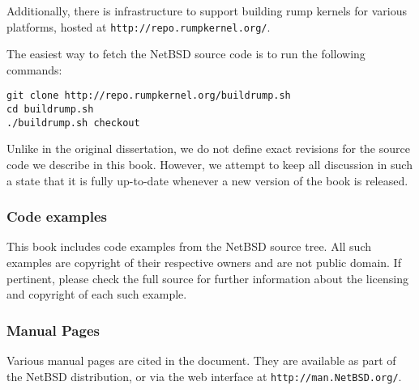 Additionally, there is infrastructure to support building rump kernels
for various platforms, hosted at \texttt{http://repo.rumpkernel.org/}.

The easiest way to fetch the NetBSD source code is to run the following
commands:

\begin{verbatim}
git clone http://repo.rumpkernel.org/buildrump.sh
cd buildrump.sh
./buildrump.sh checkout
\end{verbatim}

Unlike in the original dissertation, we do not define exact revisions
for the source code we describe in this book.  However, we attempt to
keep all discussion in such a state that it is fully up-to-date whenever
a new version of the book is released.

\subsubsection*{Code examples}

This book includes code examples from the NetBSD source
tree.  All such examples are copyright of their respective owners
and are not public domain.  If pertinent, please check the full
source for further information about the licensing and copyright
of each such example.

\subsubsection{Manual Pages}

Various manual pages are cited in the document.  They are available
as part of the NetBSD distribution, or via the web interface
at \texttt{http://man.NetBSD.org/}.
